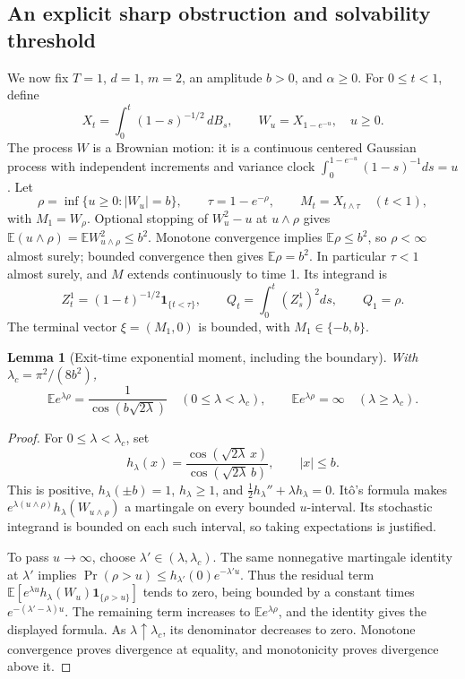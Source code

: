 \documentclass[11pt,a4paper]{article}
\newcommand{\E}{\mathbb E}
\newcommand{\ind}{\mathbf 1}
\newtheorem{lemma}[theorem]{Lemma}
\theoremstyle{definition}
\theoremstyle{remark}
\begin{document}
\subsection{An explicit sharp obstruction and solvability threshold}
We now fix $T=1$, $d=1$, $m=2$, an amplitude $b>0$, and $\alpha\geq0$. For $0\leq t<1$, define
\[
 X_t=\int_0^t(1-s)^{-1/2}\,dB_s,
 \qquad W_u=X_{1-e^{-u}},\quad u\geq0.
\]
The process $W$ is a Brownian motion: it is a continuous centered Gaussian process with independent increments and variance clock
$\int_0^{1-e^{-u}}(1-s)^{-1}ds=u$.
Let
\[
 \rho=\inf\{u\geq0:|W_u|=b\},\qquad
 \tau=1-e^{-\rho},\qquad M_t=X_{t\wedge\tau}\quad(t<1),
\]
with $M_1=W_\rho$. Optional stopping of $W_u^2-u$ at $u\wedge\rho$ gives
$\E(u\wedge\rho)=\E W_{u\wedge\rho}^2\leq b^2$. Monotone convergence implies $\E\rho\leq b^2$, so $\rho<\infty$ almost surely; bounded convergence then gives $\E\rho=b^2$. In particular $\tau<1$ almost surely, and $M$ extends continuously to time 1. Its integrand is
\[
 Z_t^1=(1-t)^{-1/2}\ind_{\{t<\tau\}},\qquad
 Q_t=\int_0^t(Z_s^1)^2ds,\qquad Q_1=\rho.
\]
The terminal vector $\xi=(M_1,0)$ is bounded, with $M_1\in\{-b,b\}$.

\begin{lemma}[Exit-time exponential moment, including the boundary]
With $\lambda_c=\pi^2/(8b^2)$,
\[
 \E e^{\lambda\rho}=
 \frac1{\cos(b\sqrt{2\lambda})}\quad(0\leq\lambda<\lambda_c),
 \qquad
 \E e^{\lambda\rho}=\infty\quad(\lambda\geq\lambda_c).
\]
\end{lemma}
\begin{proof}
For $0\leq\lambda<\lambda_c$, set
\[
 h_\lambda(x)=\frac{\cos(\sqrt{2\lambda}\,x)}
                    {\cos(\sqrt{2\lambda}\,b)},\qquad |x|\leq b.
\]
This is positive, $h_\lambda(\pm b)=1$, $h_\lambda\geq1$, and
$\tfrac12h_\lambda''+\lambda h_\lambda=0$.
It\^o's formula makes $e^{\lambda(u\wedge\rho)}h_\lambda(W_{u\wedge\rho})$ a martingale on every bounded $u$-interval. Its stochastic integrand is bounded on each such interval, so taking expectations is justified.

To pass $u\to\infty$, choose $\lambda'\in(\lambda,\lambda_c)$. The same nonnegative martingale identity at $\lambda'$ implies
$\Pr(\rho>u)\leq h_{\lambda'}(0)e^{-\lambda'u}$.
Thus the residual term
$\E[e^{\lambda u}h_\lambda(W_u)\ind_{\{\rho>u\}}]$
tends to zero, being bounded by a constant times $e^{-(\lambda'-\lambda)u}$. The remaining term increases to $\E e^{\lambda\rho}$, and the identity gives the displayed formula. As $\lambda\uparrow\lambda_c$, its denominator decreases to zero. Monotone convergence proves divergence at equality, and monotonicity proves divergence above it.
\end{proof}
\end{document}
